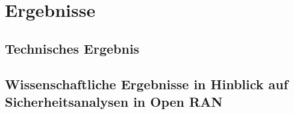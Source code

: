 \chapter{Ergebnisse}
\label{chap:ergebnisse}
\section{Technisches Ergebnis}
\label{sec:technischesErgebnis}
\section[Wissenschaftliches Ergebnis]{Wissenschaftliche Ergebnisse in Hinblick auf Sicherheitsanalysen in Open RAN}
